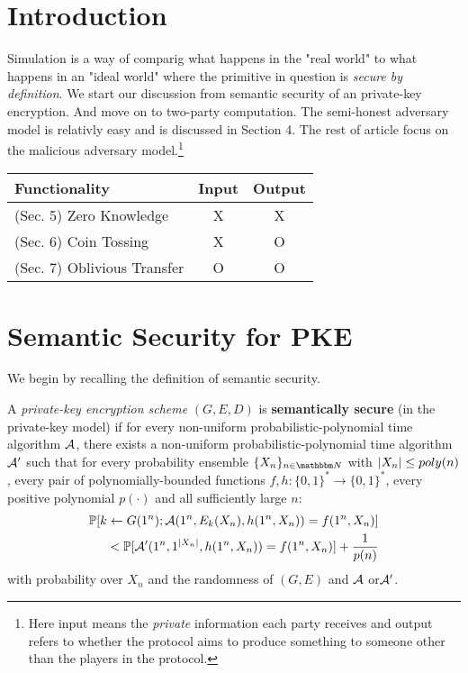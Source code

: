 \vspace*{4mm} 

\section{Introduction}
Simulation is a way of comparig what happens in the "real world" to what happens in an "ideal world" where the primitive in question is {\it secure by definition}. We start our discussion from semantic security of an private-key encryption. And move on to two-party computation. The semi-honest adversary model is relativly easy and is discussed in Section 4. The rest of article focus on the malicious adversary model.\footnote{Here input means the \textit{private} information each party receives and output refers to whether the protocol aims to produce something to someone other than the players in the protocol.}

\vspace{4mm}
\begin{tabular}{|l|c|c|}
\hline
Functionality & Input & Output\\
\hline
(Sec. 5) Zero Knowledge & X & X\\
(Sec. 6) Coin Tossing & X & O \\
(Sec. 7) Oblivious Transfer & O & O \\
\hline
\end{tabular}

\section{Semantic Security for PKE}
We begin by recalling the definition of semantic security.
\begin{definition} A {\it private-key encryption scheme} $(G,E,D)$ is {\bf semantically secure} (in the private-key model) if for every non-uniform probabilistic-polynomial time algorithm $\mathcal{A}$, there exists a non-uniform probabilistic-polynomial time algorithm $\mathcal{A}'$ such that for every probability ensemble $\{X_n\}_{n\in\N}$ with $\left|X_n\right|\leq poly(n)$, every pair of polynomially-bounded functions $f,h:\{0,1\}^*\to\{0,1\}^*$, every positive polynomial $p(\cdot)$ and all sufficiently large $n$:
\begin{align}
    \mathop{\mathbb P\/}[k\leftarrow G(1^n);\mathcal{A}(1^n,E_k(X_n), h(1^n,X_n)) = f(1^n, X_n)] \\
    < \mathop{\mathbb P\/}[\mathcal{A}'(1^n,1^{\left|X_n\right|}, h(1^n,X_n)) = f(1^n,X_n) ]+ \frac{1}{p(n)}\label{eq:semanticsecure}
\end{align}
with probability over $X_n$ and the randomness of $(G,E)$ and $\mathcal{A}$ or$\mathcal{A}'$.
\end{definition}

